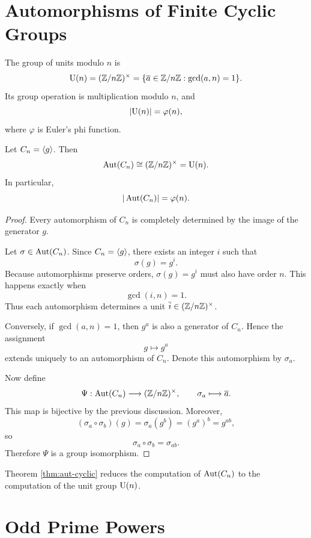 \section{Automorphisms of Finite Cyclic Groups}

\begin{definition}
The group of units modulo $n$ is
\[
    \mathrm{U}(n)=(\mathbb{Z}/n\mathbb{Z})^\times
    =\{\overline{a}\in \mathbb{Z}/n\mathbb{Z}:\gcd(a,n)=1\}.
\]
Its group operation is multiplication modulo $n$, and
\[
    |\mathrm{U}(n)|=\varphi(n),
\]
where $\varphi$ is Euler's phi function.
\end{definition}

\begin{theorem}\label{thm:aut-cyclic}
Let $C_n=\langle g\rangle$. Then
\[
    \operatorname{Aut}(C_n)\cong (\mathbb{Z}/n\mathbb{Z})^\times=\mathrm{U}(n).
\]
In particular,
\[
    |\operatorname{Aut}(C_n)|=\varphi(n).
\]
\end{theorem}

\begin{proof}
Every automorphism of $C_n$ is completely determined by the image of the generator $g$.

Let $\sigma\in\operatorname{Aut}(C_n)$. Since $C_n=\langle g\rangle$, there exists an integer $i$ such that
\[
    \sigma(g)=g^i.
\]
Because automorphisms preserve orders, $\sigma(g)=g^i$ must also have order $n$. This happens exactly when
\[
    \gcd(i,n)=1.
\]
Thus each automorphism determines a unit $\overline{i}\in(\mathbb{Z}/n\mathbb{Z})^\times$.

Conversely, if $\gcd(a,n)=1$, then $g^a$ is also a generator of $C_n$. Hence the assignment
\[
    g\longmapsto g^a
\]
extends uniquely to an automorphism of $C_n$. Denote this automorphism by $\sigma_a$.

Now define
\[
    \Psi:\operatorname{Aut}(C_n)\longrightarrow (\mathbb{Z}/n\mathbb{Z})^\times,
    \qquad
    \sigma_a\longmapsto \overline{a}.
\]
This map is bijective by the previous discussion. Moreover,
\[
    (\sigma_a\circ\sigma_b)(g)
    =\sigma_a(g^b)
    =(g^a)^b
    =g^{ab},
\]
so
\[
    \sigma_a\circ\sigma_b=\sigma_{ab}.
\]
Therefore $\Psi$ is a group isomorphism.
\end{proof}

\begin{remark}
Theorem \ref{thm:aut-cyclic} reduces the computation of $\operatorname{Aut}(C_n)$ to the computation of the unit group $\mathrm{U}(n)$.
\end{remark}

\section{Odd Prime Powers}

